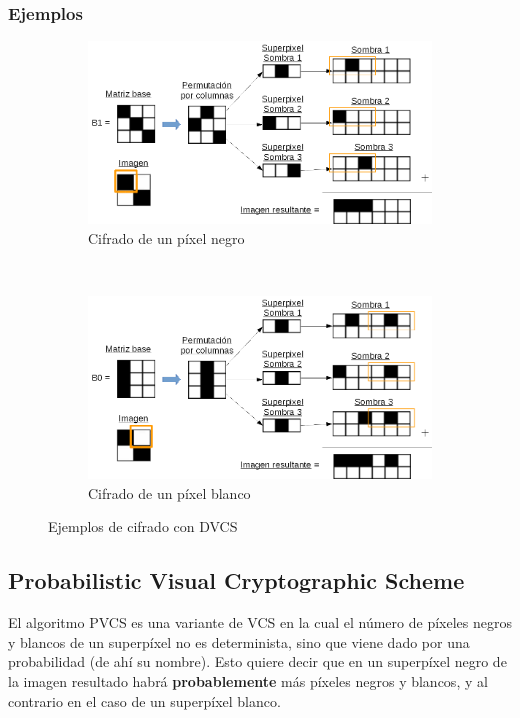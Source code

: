\subsubsection{Ejemplos}
\begin{figure}[ht]
	\centering
	\begin{subfigure}[t]{0.9\textwidth}
		\centering
		\includegraphics[width=\textwidth]{images/DVCSnegro}
		\caption{Cifrado de un píxel negro}
		\label{fig:cifradoDVCSn}
	\end{subfigure}
	\\[0.5cm]
	\begin{subfigure}[t]{0.9\textwidth}
		\centering
		\includegraphics[width=\textwidth]{images/DVCSblanco}
		\caption{Cifrado de un píxel blanco}
		\label{fig:cifradoDVCSb}
	\end{subfigure}
	\caption{Ejemplos de cifrado con DVCS}
	\label{fig:ejemplosDVCS}
\end{figure}

\newpage
\subsection[PVCS]{Probabilistic Visual Cryptographic Scheme}
El algoritmo PVCS es una variante de VCS en la cual el número de píxeles negros
y blancos de un superpíxel no es determinista, sino que viene dado por una
probabilidad (de ahí su nombre). Esto quiere decir que en un superpíxel negro de
la imagen resultado habrá \textbf{probablemente} más píxeles negros y blancos, y
al contrario en el caso de un superpíxel blanco.

